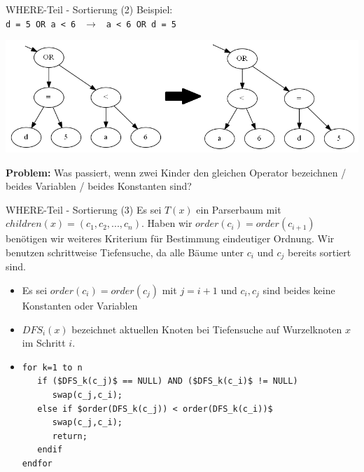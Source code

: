 \documentclass{beamer}
\begin{document}
\begin{frame}[fragile]{WHERE-Teil - Sortierung (2)}
Beispiel:\\
\verb|d = 5 OR a < 6| $\ \ \to\ \ $ \verb|a < 6 OR d = 5|\\
\begin{center}
\includegraphics[scale=0.3]{sort_step1.png}
\end{center}
\textbf{Problem: }Was passiert, wenn zwei Kinder den gleichen Operator bezeichnen / beides Variablen / beides Konstanten sind?
\end{frame}

\begin{frame}[fragile]{WHERE-Teil - Sortierung (3)}
Es sei $T(x)$ ein Parserbaum mit $children(x) = (c_1,c_2,...,c_n)$. Haben wir $order(c_i) = order(c_{i+1})$ benötigen wir weiteres Kriterium für Bestimmung eindeutiger Ordnung.
Wir benutzen schrittweise Tiefensuche, da alle Bäume unter $c_i$ und $c_j$ bereits sortiert sind.
\begin{itemize}
\item Es sei $order(c_i) = order(c_j)$ mit $j = i + 1$ und $c_i,c_j$ sind beides keine Konstanten oder Variablen
\item $DFS_i(x)$ bezeichnet aktuellen Knoten bei Tiefensuche auf Wurzelknoten $x$ im Schritt $i$.
\item \begin{lstlisting}[mathescape]
for k=1 to n
   if ($DFS_k(c_j)$ == NULL) AND ($DFS_k(c_i)$ != NULL)
   	  swap(c_j,c_i);
   else if $order(DFS_k(c_j)) < order(DFS_k(c_i))$
      swap(c_j,c_i);
      return;
   endif
endfor
   
\end{lstlisting}
\end{itemize}
\end{frame}
\end{document}

